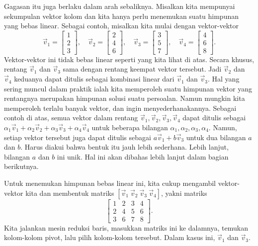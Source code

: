 Gagasan itu juga berlaku dalam arah sebaliknya. Misalkan kita mempunyai sekumpulan vektor kolom
dan kita hanya perlu menemukan suatu himpunan yang bebas linear. Sebagai contoh, misalkan
kita mulai dengan vektor-vektor
\begin{equation*}
\vec{v}_1 =
\begin{bmatrix}
1 \\
2 \\
3
\end{bmatrix}
,
\quad
\vec{v}_2 =
\begin{bmatrix}
2 \\
4 \\
6
\end{bmatrix}
,
\quad
\vec{v}_3 =
\begin{bmatrix}
3 \\
5 \\
7
\end{bmatrix}
,
\quad
\vec{v}_4 =
\begin{bmatrix}
4 \\
6 \\
8
\end{bmatrix} .
\end{equation*}
Vektor-vektor ini tidak bebas linear seperti yang kita lihat di atas. Secara khusus,
rentang $\vec{v}_1$ dan $\vec{v}_3$ sama dengan
rentang keempat vektor tersebut. Jadi $\vec{v}_2$ dan $\vec{v}_4$
keduanya dapat ditulis sebagai kombinasi linear dari $\vec{v}_1$ dan $\vec{v}_3$.
Hal yang sering muncul dalam praktik ialah kita memperoleh suatu himpunan vektor
yang rentangnya merupakan himpunan solusi suatu persoalan. Namun mungkin kita memperoleh terlalu
banyak vektor, dan ingin menyederhanakannya. Sebagai contoh di atas, semua vektor dalam
rentang
$\vec{v}_1, \vec{v}_2, \vec{v}_3, \vec{v}_4$ dapat ditulis sebagai
$\alpha_1 \vec{v}_1 + \alpha_2 \vec{v}_2 + \alpha_3 \vec{v}_3 + \alpha_4
\vec{v}_4$ untuk beberapa bilangan $\alpha_1,\alpha_2,\alpha_3,\alpha_4$. Namun,
setiap vektor tersebut juga dapat ditulis sebagai
$a \vec{v}_1 + b \vec{v}_3$ untuk dua bilangan $a$ dan $b$. Harus
diakui bahwa bentuk itu jauh lebih sederhana. Lebih lanjut, bilangan $a$ dan $b$ ini
unik. Hal ini akan dibahas lebih lanjut dalam bagian berikutnya.

Untuk menemukan himpunan bebas linear ini, kita cukup mengambil vektor-vektor kita
dan membentuk matriks $[ \vec{v}_1 ~ \vec{v}_2 ~ \vec{v}_3 ~ \vec{v}_4 ]$,
yakni matriks
\begin{equation*}
\begin{bmatrix}
1 & 2 & 3 & 4 \\
2 & 4 & 5 & 6 \\
3 & 6 & 7 & 8
\end{bmatrix} .
\end{equation*}
Kita jalankan mesin reduksi baris, masukkan matriks ini ke dalamnya, temukan
kolom-kolom pivot, lalu pilih kolom-kolom tersebut. Dalam kasus ini, $\vec{v}_1$ dan
$\vec{v}_3$.

